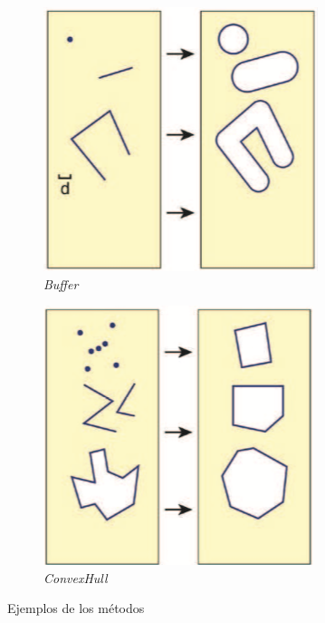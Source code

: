 \begin{figure}[H]
	\centering
	\begin{subfigure}[h]{0.32\textwidth} 
		\includegraphics[width=\textwidth]{imagenes/capitulo4/buffer}
		\caption{\textit{Buffer}}
	\end{subfigure}       
	\begin{subfigure}[h]{0.32\textwidth} 
		\includegraphics[width=\textwidth]{imagenes/capitulo4/convexHull}
		\caption{\textit{ConvexHull}}
	\end{subfigure}
	\caption{Ejemplos de los métodos \cite{AsignaturaSIG}}
	\label{fig:ejemplos-metodos}
\end{figure}



